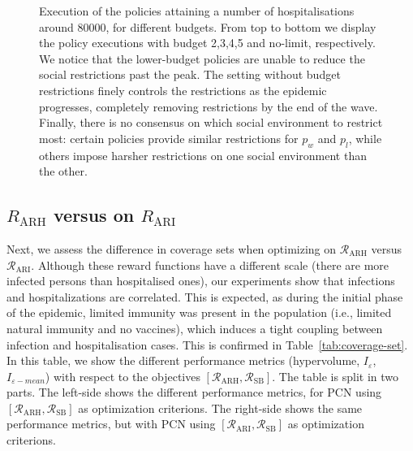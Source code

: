 \documentclass{article}
\newcommand{\mdprewardfn}{\mathcal{R}}
\begin{document}
\begin{figure}
    \centering
    
    \caption{Execution of the policies attaining a number of hospitalisations around $80000$, for different budgets. From top to bottom we display the policy executions with budget 2,3,4,5 and no-limit, respectively. We notice that the lower-budget policies are unable to reduce the social restrictions past the peak. The setting without budget restrictions finely controls the restrictions as the epidemic progresses, completely removing restrictions by the end of the wave. Finally, there is no consensus on which social environment to restrict most: certain policies provide similar restrictions for $p_w$ and $p_l$, while others impose harsher restrictions on one social environment than the other.
    }
    \label{fig:pe-binomial-arh-budgets}
\end{figure}

\subsection{$R_\text{ARH}$ versus on $R_\text{ARI}$}
\label{sec:arh-vs-ari}

Next, we assess the difference in coverage sets when optimizing on $\mdprewardfn_\text{ARH}$ versus $\mdprewardfn_\text{ARI}$. Although these reward functions have a different scale (there are more infected persons than hospitalised ones), our experiments show that infections and hospitalizations are correlated. This is expected, as during the initial phase of the epidemic, limited immunity was present in the population (i.e., limited natural immunity and no vaccines), which induces a tight coupling between infection and hospitalisation cases. This is confirmed in Table~\ref{tab:coverage-set}. In this table, we show the different performance metrics (hypervolume, $I_\varepsilon$, $I_{\varepsilon-mean}$) with respect to the objectives $[\mdprewardfn_\text{ARH}, \mdprewardfn_\text{SB}]$. The table is split in two parts. The left-side shows the different performance metrics, for PCN using $[\mdprewardfn_\text{ARH}, \mdprewardfn_\text{SB}]$ as optimization criterions. The right-side shows the same performance metrics, but with PCN using $[\mdprewardfn_\text{ARI}, \mdprewardfn_\text{SB}]$ as optimization criterions.
\end{document}

